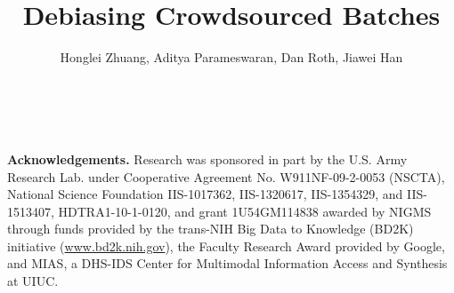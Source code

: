 \documentclass{sig-alternate-2013}
\newcommand{\vpara}[1]{\vspace{0.05in}\noindent\textbf{#1 }}
\begin{document}
\title{
Debiasing Crowdsourced Batches %
}



\author{
\alignauthor Honglei Zhuang, Aditya Parameswaran, Dan Roth, Jiawei Han \\
  \\
  \\
}



%



\maketitle









\sloppy










\scriptsize
\vpara{Acknowledgements.}
Research was sponsored in part by the U.S. Army Research Lab. under Cooperative Agreement No. W911NF-09-2-0053 (NSCTA), National Science Foundation IIS-1017362, IIS-1320617, IIS-1354329, and IIS-1513407, HDTRA1-10-1-0120, and grant 1U54GM114838 awarded by NIGMS through funds provided by the trans-NIH Big Data to Knowledge (BD2K) initiative (\url{www.bd2k.nih.gov}), the Faculty Research Award provided by Google, and MIAS, a DHS-IDS Center for Multimodal Information Access and Synthesis at UIUC. %
\normalsize


\balance
\small




%
\end{document}
